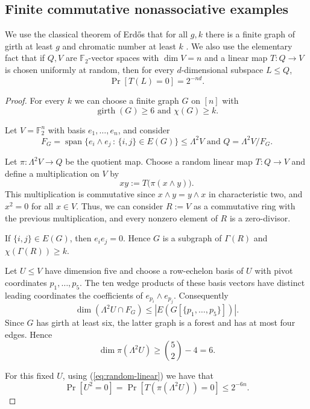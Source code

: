 \documentclass[a4paper,11pt]{amsart}
\theoremstyle{definition}
\newcommand{\Span}{\operatorname{span}}
\newcommand{\girth}{\operatorname{girth}}
\newcommand{\F}{\mathbb F}
\begin{document}
\subsection{Finite commutative nonassociative examples}
\label{subsec:finite-nonassoc}
We use the classical theorem of Erd\H{o}s that for all $g,k$ there is a finite
graph of girth at least $g$ and chromatic number at least $k$
\cite{Erdos59}.  We also use the elementary fact that if $Q,V$ are
$\F_2$-vector spaces with $\dim V=n$ and a linear map $T:Q\to V$ is chosen
uniformly at random, then for every $d$-dimensional subspace $L\le Q$,
\begin{equation}\label{eq:random-linear}
 \Pr[T(L)=0]=2^{-nd}.
\end{equation}

\nonassocunbounded*
\begin{proof}

For every $k$ we can choose a finite graph $G$ on $[n]$ with 
\[
 \girth(G)\ge6\text{ and } \chi(G)\ge k.
\]

Let $V=\F_2^n$ with basis
$e_1,\ldots,e_n$, and consider
\[
 F_G=\Span\{e_i\wedge e_j\,:\,\{i,j\}\in E(G)\}\le\Lambda^2V
 \text{ and } Q=\Lambda^2V/F_G.
\]

Let $\pi:\Lambda^2V\to Q$ be the quotient map.  Choose a random linear map
$T:Q\to V$ and define a multiplication on $V$ by
\begin{equation}\label{eq:nonassoc-product}
 xy:=T\bigl(\pi(x\wedge y)\bigr).
\end{equation}
This multiplication is commutative since $x\wedge y=y\wedge x$ in characteristic two, and $x^2=0$ for all $x\in V$.  Thus, we can consider $R:=V$ as a commutative ring with the previous multiplication, and every nonzero element of $R$ is a
zero-divisor.

If $\{i,j\}\in E(G)$, then $e_ie_j=0$.  Hence $G$ is a subgraph of $\Gamma(R)$ and $\chi(\Gamma(R))\geq k$.


Let $U\le V$ have dimension five and choose a row-echelon basis of $U$ with
pivot coordinates $p_1,\ldots,p_5$.  The ten wedge products of these basis
vectors have distinct leading coordinates the coefficients of
$e_{p_i}\wedge e_{p_j}$.  Consequently
\[
 \dim(\Lambda^2U\cap F_G)
 \le |E(G[\{p_1,\ldots,p_5\}])|.
\]
Since $G$ has girth at least six, the latter graph is a forest and has at most
four edges.  Hence
\[
 \dim\pi(\Lambda^2U)\ge\binom52-4=6.
\]

For this fixed $U$, using (\ref{eq:random-linear}) we have that
\[
 \Pr[U^2=0]=\Pr[T(\pi(\Lambda^2U))=0]\le2^{-6n}.
\]


\end{proof}
\end{document}
